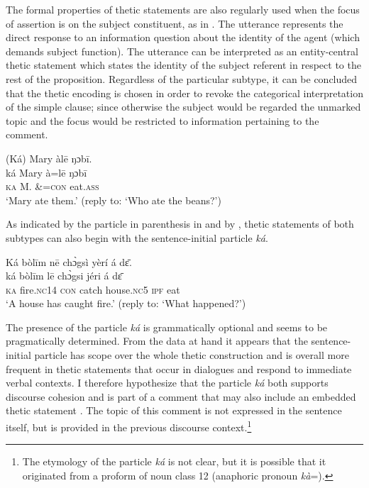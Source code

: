 \documentclass[output=paper]{langsci/langscibook}
\begin{document}
The formal properties of thetic statements are also regularly used when the focus of assertion is on the subject constituent, as in . The utterance represents the direct response to an information question about the identity of the agent (which demands subject function). The utterance can be interpreted as an entity-central thetic statement which states the identity of the subject referent in respect to the rest of the proposition. Regardless of the particular subtype, it can be concluded that the thetic encoding is chosen in order to revoke the categorical interpretation of the simple clause; since otherwise the subject would be regarded the unmarked topic and the focus would be restricted to information pertaining to the comment. 

\ea\label{ex:schwarz:25}
\glll  (Ká)  Mary  àl\={e}    ŋɔb\={i}.\\
    \textup{ká}  Mary  à=l\={e}    {ŋɔb\={i}}\\
     \textsc{ka}  M.  \&=\textsc{con}  eat.\textsc{ass}\\
\glt ‘Mary ate them.’ (reply to: ‘Who ate the beans?’)
\z

As indicated by the particle in parenthesis in  and by , thetic statements of both subtypes can also begin with the sentence-initial particle \textit{ká}. 

\ea\label{ex:schwarz:26}
\glll   Ká  bòl\={i}m    n\={e}  ch\`{ɔ}gsì  yèrí    á  d\={ɛ}.\\
    \textup{ká}  bòl\={i}m    l\={e}  ch\`{ɔ}gsi  jéri    á  d\={ɛ}\\
     \textsc{  ka}  fire.\textsc{nc}14  \textsc{con}  catch   house.\textsc{nc}5   \textsc{ipf}   eat\\
\glt ‘A house has caught fire.’ (reply to: ‘What happened?’)
\z

The presence of the particle \textit{ká} is grammatically optional and seems to be pragmatically determined. From the data at hand it appears that the sentence-initial particle has scope over the whole thetic construction and is overall more frequent in thetic statements that occur in dialogues and respond to immediate verbal contexts. I therefore hypothesize that the particle \textit{ká} both supports discourse cohesion and is part of a comment that may also include an embedded thetic statement . The topic of this comment is not expressed in the sentence itself, but is provided in the previous discourse context.\footnote{The etymology of the particle \textit{ká} is not clear, but it is possible that it originated from a proform of noun class 12 (anaphoric pronoun \textit{kà}=).} 
\end{document}
